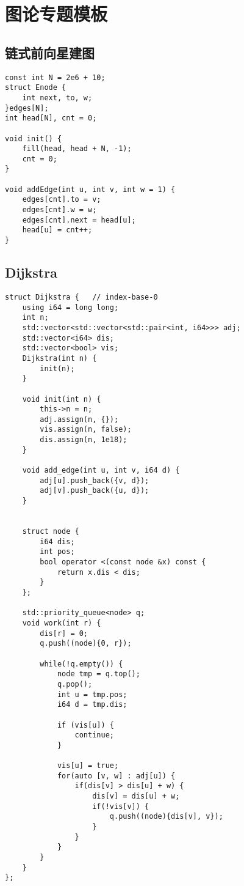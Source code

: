\section{图论专题模板}
\subsection{链式前向星建图}
\begin{lstlisting}
const int N = 2e6 + 10;
struct Enode {
    int next, to, w;
}edges[N];
int head[N], cnt = 0;

void init() {
    fill(head, head + N, -1);
    cnt = 0;
}

void addEdge(int u, int v, int w = 1) {
    edges[cnt].to = v;
    edges[cnt].w = w;
    edges[cnt].next = head[u];
    head[u] = cnt++;
}
\end{lstlisting}



\subsection{Dijkstra}
\begin{lstlisting}
struct Dijkstra {   // index-base-0
    using i64 = long long;
    int n;
    std::vector<std::vector<std::pair<int, i64>>> adj;
    std::vector<i64> dis;
    std::vector<bool> vis;
    Dijkstra(int n) {
        init(n);
    }

    void init(int n) {
        this->n = n;
        adj.assign(n, {});
        vis.assign(n, false);
        dis.assign(n, 1e18);
    }
 
    void add_edge(int u, int v, i64 d) {
        adj[u].push_back({v, d});
        adj[v].push_back({u, d});
    }
 

    struct node {
        i64 dis;
        int pos;
        bool operator <(const node &x) const {
            return x.dis < dis;
        }
    };
 
    std::priority_queue<node> q;
    void work(int r) {
        dis[r] = 0;
        q.push((node){0, r});
 
        while(!q.empty()) {
            node tmp = q.top();
            q.pop();
            int u = tmp.pos;
            i64 d = tmp.dis;
 
            if (vis[u]) {
                continue;
            }
 
            vis[u] = true;
            for(auto [v, w] : adj[u]) {
                if(dis[v] > dis[u] + w) {
                    dis[v] = dis[u] + w;
                    if(!vis[v]) {
                        q.push((node){dis[v], v});
                    }
                }
            }
        }
    }
};
\end{lstlisting}

